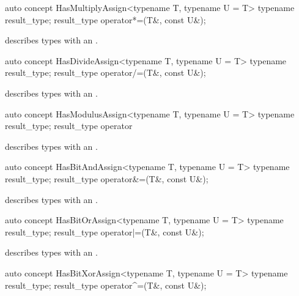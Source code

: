 \documentclass[american,twoside]{book}
\begin{document}
\begin{itemdecl}
auto concept HasMultiplyAssign<typename T, typename U = T> {
  typename result_type;
  result_type operator*=(T&, const U&);
}
\end{itemdecl}

\begin{itemdescr}
\pnum
\mbox{\reallynote} describes types with an \mbox{}.
\end{itemdescr}

\begin{itemdecl}
auto concept HasDivideAssign<typename T, typename U = T> {
  typename result_type;
  result_type operator/=(T&, const U&);
}
\end{itemdecl}

\begin{itemdescr}
\pnum
\mbox{\reallynote} describes types with an \mbox{}.
\end{itemdescr}

\begin{itemdecl}
auto concept HasModulusAssign<typename T, typename U = T> {
  typename result_type;
  result_type operator%
}
\end{itemdecl}

\begin{itemdescr}
\pnum
\mbox{\reallynote} describes types with an \mbox{}.
\end{itemdescr}

\begin{itemdecl}
auto concept HasBitAndAssign<typename T, typename U = T> {
  typename result_type;
  result_type operator&=(T&, const U&);
}
\end{itemdecl}

\begin{itemdescr}
\pnum
\mbox{\reallynote} describes types with an \mbox{}.
\end{itemdescr}

\begin{itemdecl}
auto concept HasBitOrAssign<typename T, typename U = T> {
  typename result_type;
  result_type operator|=(T&, const U&);
}
\end{itemdecl}

\begin{itemdescr}
\pnum
\mbox{\reallynote} describes types with an \mbox{}.
\end{itemdescr}

\begin{itemdecl}
auto concept HasBitXorAssign<typename T, typename U = T> {
  typename result_type;
  result_type operator^=(T&, const U&);
}
\end{itemdecl}
\end{document}
